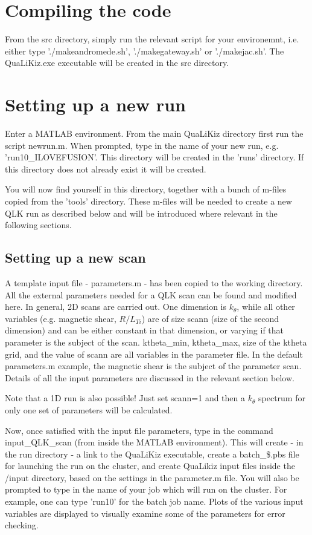 \documentclass{article}
\begin{document}
\section{Compiling the code}
From the src directory, simply run the relevant script for your environemnt, i.e. either type './makeandromede.sh', './makegateway.sh' or './makejac.sh'. The QuaLiKiz.exe executable will be created in the src directory. 

\section{Setting up a new run}
Enter a MATLAB environment. From the main QuaLiKiz directory first run the script newrun.m. When prompted, type in the name of your new run, e.g. 'run10\_ILOVEFUSION'. This directory will be created in the 'runs' directory. If this directory does not already exist it will be created. 

You will now find yourself in this directory, together with a bunch of m-files copied from the 'tools' directory. These m-files will be needed to create a new QLK run as described below and will be introduced where relevant in the following sections.

\subsection{Setting up a new scan}
A template input file - parameters.m - has been copied to the working directory. All the external parameters needed for a QLK scan can be found and modified here. In general, 2D scans are carried out. One dimension is $k_\theta$, while all other variables (e.g. magnetic shear, $R/L_{Ti}$) are of size scann (size of the second dimension) and can be either constant in that dimension, or varying if that parameter is the subject of the scan. ktheta\_min, ktheta\_max, size of the ktheta grid, and the value of scann are all variables in the parameter file. In the default parameters.m example, the magnetic shear is the subject of the parameter scan. Details of all the input parameters are discussed in the relevant section below.

Note that a 1D run is also possible! Just set scann=1 and then a $k_\theta$ spectrum for only one set of parameters will be calculated.

Now, once satisfied with the input file parameters, type in the command input\_QLK\_scan (from inside the MATLAB environment). This will create - in the run directory - a link to the QuaLiKiz executable, create a batch\_\$.pbs file for launching the run on the cluster, and create QuaLikiz input files inside the /input directory, based on the settings in the parameter.m file. You will also be prompted to type in the name of your job which will run on the cluster. For example, one can type 'run10' for the batch job name. Plots of the various input variables are displayed to visually examine some of the parameters for error checking.
\end{document}
